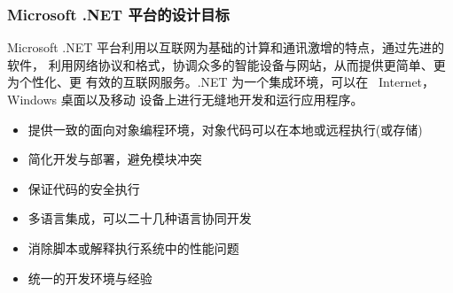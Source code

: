 \begin{frame}
\frametitle{Microsoft .NET 平台的设计目标}
\CJKindent

Microsoft .NET 平台利用以互联网为基础的计算和通讯激增的特点，通过先进的软件，
利用网络协议和格式，协调众多的智能设备与网站，从而提供更简单、更为个性化、更
有效的互联网服务。.NET 为一个集成环境，可以在 ~Internet，Windows 桌面以及移动
设备上进行无缝地开发和运行应用程序。

\begin{itemize}
\item 提供一致的面向对象编程环境，对象代码可以在本地或远程执行(或存储)
\item 简化开发与部署，避免模块冲突
\item 保证代码的安全执行
\item 多语言集成，可以二十几种语言协同开发
\item 消除脚本或解释执行系统中的性能问题
\item 统一的开发环境与经验
\end{itemize}

\end{frame}

